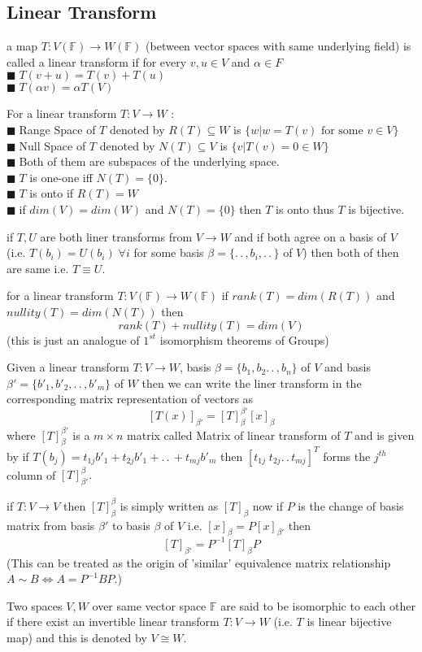 \documentclass[11pt]{extarticle}
\newcommand{\F}{\mathbb{F}}
\newcommand{\ra}{\rightarrow}
\newcommand{\w}[1]{\text{#1}}
\newcommand{\ck}{.\,.\,}
\newcommand{\snote}[1]{{\footnotesize(#1)}}
\newcommand{\tm}{\times}
\newcommand{\tbx}[2][]{
	\begin{tcolorbox}[enhanced,breakable,size=small,colback=black!2!white,title={#1},arc is angular, arc=1.5mm,drop fuzzy shadow]
		#2
	\end{tcolorbox}
}
\newcommand{\y}{$\blacksquare\;$}
\newcommand{\yi}{\\$\blacksquare\;$}
\begin{document}
\begin{multicols}{2}
	\section{Linear Transform}
	\tbx[Definition]{ a map $ T:V(\F)\ra W(\F) $ (between vector spaces with same underlying field)  is called a linear transform if for every $ v,u\in V $ and $ \alpha\in F $ 
	\yi $ T(v+u)=T(v)+T(u) $ 
	\yi $ T(\alpha v)=\alpha T(V) $}
	\tbx[Range and Null space]{ For a linear transform $ T:V\ra W $ :\\
	\y Range Space of $ T $ denoted by $ R(T)\subseteq W$ is $ \{w|w=T(v)\w{ for some }v\in V\} $
	\yi Null Space of $ T $ denoted by $ N(T)\subseteq V $ is $ \{v|T(v)=0\in W\} $
	\yi Both of them are subspaces of the underlying space.
	\yi $ T $ is one-one iff $ N(T)=\{0\} .$
	\yi $ T $ is onto if $ R(T)=W $ 
	\yi if $ dim(V)=dim(W) $ and $ N(T)=\{0\} $ then $ T $ is onto thus $ T $ is bijective. }
	\tbx{ if $ T,U $ are both liner transforms from $ V\ra W $ and if both agree on a basis of $ V $ \snote{i.e. $ T(b_i)=U(b_i) \; \forall i$ for some basis $ \beta=\{\ck,b_i,\ck\} $ of $ V $} then both of then are same i.e. $ T\equiv U .$}
	\tbx[Rank Nullity Theorem]{for a linear transform  $ T:V(\F)\ra W(\F) $ if $ rank(T)=dim(R(T)) $ and  $ nullity(T)=dim(N(T)) $ then \[ rank(T)+nullity(T)=dim(V)\]
	\snote{this is just an analogue of $ 1^{st} $ isomorphism theorems of Groups}}
	\tbx[Matrix of Linear Transform]{Given a linear transform $ T:V\ra W$, basis $ \beta=\{b_1,b_2\ck,b_n\}  $ of $ V $ and basis $ \beta'=\{b'_1,b'_2,\ck,b'_m\} $ of $ W $ then we can write the liner transform in the corresponding matrix representation of vectors as 
	\[ [T(x)]_{\beta'}=[T]_{\beta}^{\beta'}[x]_\beta \]
	 where $ [T]_{\beta}^{\beta'}$ is a $ m\tm n $ matrix  called Matrix of linear transform of $ T $ and is given by if $ T(b_j)=t_{1j}b'_1+t_{2j}b'_1 +\ck +t_{mj}b'_m$  then $ [t_{1j}\; t_{2j} \ck t_{mj}]^T $ forms the $ j^{th} $ column of $ [T]_{\beta'}^{\beta} .$}
	 \tbx[Change of Basis]{  if $ T:V\ra V $ then $ [T]_\beta^\beta $ is simply written as $ [T]_\beta $ now if $ P $ is the change of basis matrix from basis $ \beta'$ to basis $ \beta$ of $ V $ i.e. $ [x]_\beta=P[x]_{\beta' }$ then
	 \[[T]_{\beta'}= P^{-1}[T]_\beta P\]
	 \snote{This can be treated as the origin of 'similar' equivalence matrix relationship $ A\sim B \iff A=P^{-1}BP .$}
	 }
	 \tbx[Isomorphism of Vector spaces]{ Two spaces $ V,W $ over same vector space $ \F $ are said to be isomorphic to each other if there exist an invertible linear transform $ T :V\ra W$ (i.e. $ T $ is linear bijective map) and this is denoted by $ V\cong W. $ 
}
\end{multicols}
\end{document}
